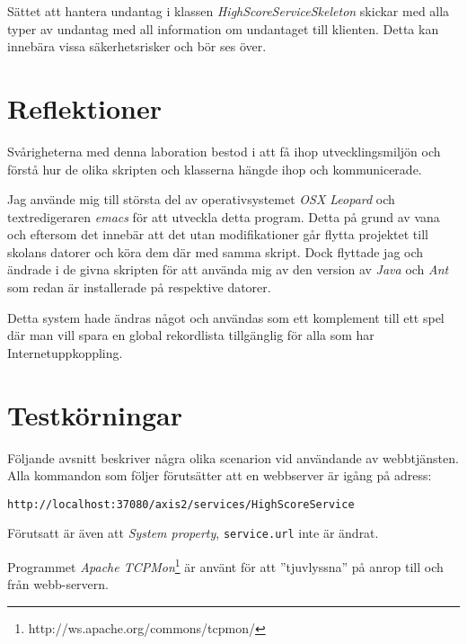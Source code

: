 \documentclass[a4paper, 12pt]{article}
\begin{document}
Sättet att hantera undantag i klassen
\textit{HighScoreServiceSkeleton} skickar med alla typer av undantag
med all information om undantaget till klienten. Detta kan innebära
vissa säkerhetsrisker och bör ses över.

\section{Reflektioner}\label{Reflektioner}

Svårigheterna med denna laboration bestod i att få ihop
utvecklingsmiljön och förstå hur de olika skripten och klasserna
hängde ihop och kommunicerade.

Jag använde mig till största del av operativsystemet \textit{OSX
  Leopard} och textredigeraren \textit{emacs} för att utveckla detta
program. Detta på grund av vana och eftersom det innebär att det utan
modifikationer går flytta projektet till skolans datorer och köra dem
där med samma skript. Dock flyttade jag och ändrade i de givna
skripten för att använda mig av den version av \textit{Java} och
\textit{Ant} som redan är installerade på respektive datorer.

Detta system hade ändras något och användas som ett komplement till
ett spel där man vill spara en global rekordlista tillgänglig för alla
som har Internetuppkoppling.

\section{Testkörningar}\label{Testkorningar}
Följande avsnitt beskriver några olika scenarion vid användande av
webbtjänsten. Alla kommandon som följer förutsätter att en webbserver
är igång på adress:
\begin{footnotesize}
\verb!http://localhost:37080/axis2/services/HighScoreService!
\end{footnotesize}

Förutsatt är även att \textit{System property}, \verb!service.url!
inte är ändrat.

Programmet \textit{Apache
  TCPMon}\footnote{http://ws.apache.org/commons/tcpmon/} är använt för
att ''tjuvlyssna'' på anrop till och från webb-servern.
\end{document}
